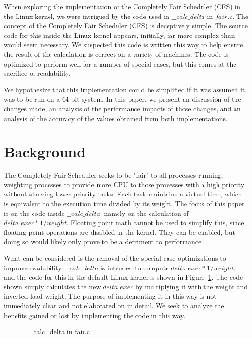 \documentclass[10pt, conference]{IEEEtran}
\begin{document}
When exploring the implementation of the Completely Fair Scheduler (CFS) in the Linux kernel, we were intrigued by the code used in $\_\_calc\_delta$ in $fair.c$.  The concept of the Completely Fair Scheduler (CFS) is deceptively simple.  The source code for this inside the Linux kernel appears, initially, far more complex than would seem necessary.  We suspected this code is written this way to help ensure the result of the calculation is correct on a variety of machines.  The code is optimized to perform well for a number of special cases, but this comes at the sacrifice of readability.

We hypothesize that this implementation could be simplified if it was assumed it was to be run on a 64-bit system.  In this paper, we present an discussion of the changes made, an analysis of the performance impacts of those changes, and an analysis of the accuracy of the values obtained from both implementations.  

\section{Background}
The Completely Fair Scheduler seeks to be "fair" to all processes running, weighting processes to provide more CPU to those processes with a high priority without starving lower-priority tasks.  Each task maintains a virtual time, which is equivalent to the execution time divided by its weight.  The focus of this paper is on the code inside $\_\_calc\_delta$, namely on the calculation of $delta\_exec * 1 / weight$.  Floating point math cannot be used to simplify this, since floating point operations are disabled in the kernel.  They can be enabled, but doing so would likely only prove to be a detriment to performance.

What can be considered is the removal of the special-case optimizations to improve readability.  $\_\_calc\_delta$ is intended to compute $delta\_exec * 1 / weight$, and the code for this in the default Linux kernel is shown in Figure~\ref{fig:figure1}.  The code shown simply calculates the new $delta\_exec$ by multiplying it with the weight and inverted load weight.  The purpose of implementing it in this way is not immediately clear and not elaborated on in detail.  We seek to analyze the benefits gained or lost by implementing the code in this way.

\begin{figure}[h]
	\centering
	
	\caption{\_\_calc\_delta in fair.c}
	\label{fig:figure1}
\end{figure}
\end{document}
